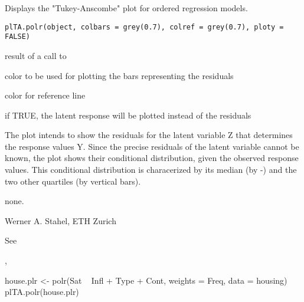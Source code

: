\documentclass{article}
\begin{document}
\begin{Description}\relax
Displays the "Tukey-Anscombe" plot for ordered regression models.
\end{Description}
\begin{Usage}
\begin{verbatim}
plTA.polr(object, colbars = grey(0.7), colref = grey(0.7), ploty = FALSE)
\end{verbatim}
\end{Usage}
\begin{Arguments}
\begin{ldescription}
\item[\code{object}] result of a call to 
\item[\code{colbars}] color to be used for plotting the bars representing
the residuals
\item[\code{colref}] color for reference line
\item[\code{ploty}] if TRUE, the latent response will be plotted instead of
the residuals
\end{ldescription}
\end{Arguments}
\begin{Details}\relax
The plot intends to show the residuals for the latent variable Z that
determines the response values Y. Since the precise residuals of the
latent variable cannot be known, the plot shows their conditional
distribution, given the observed response values. This conditional
distribution is characerized by its median (by -) and the two other
quartiles (by vertical bars).
\end{Details}
\begin{Value}
none.
\end{Value}
\begin{Author}\relax
Werner A. Stahel, ETH Zurich
\end{Author}
\begin{References}\relax
See 
\end{References}
\begin{SeeAlso}\relax
{}, 
\end{SeeAlso}
\begin{Examples}
\begin{ExampleCode}
house.plr <- polr(Sat ~ Infl + Type + Cont, weights = Freq, data = housing)
plTA.polr(house.plr)
\end{ExampleCode}
\end{Examples}
\end{document}

